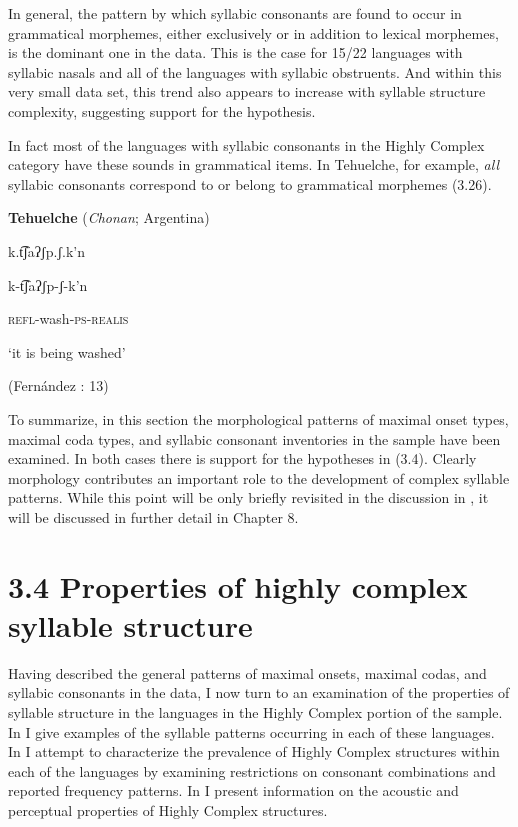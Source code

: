   In general, the pattern by which syllabic consonants are found to occur in grammatical morphemes, either exclusively or in addition to lexical morphemes, is the dominant one in the data. This is the case for 15/22 languages with syllabic nasals and all of the languages with syllabic obstruents. And within this very small data set, this trend also appears to increase with syllable structure complexity, suggesting support for the hypothesis. 



  In fact most of the languages with syllabic consonants in the Highly Complex category have these sounds in grammatical items. In Tehuelche, for example, \textit{all} syllabic consonants correspond to or belong to grammatical morphemes (3.26).



\ea\label{ex:(3.26)}
   \textbf{Tehuelche} (\textit{Chonan}; Argentina)



k.t͡ʃaʔʃp.ʃ.k’n



k{}-t͡ʃaʔʃp{}-ʃ{}-k’n



\textsc{refl}{}-wash-\textsc{ps-realis}



‘it is being washed’



(Fernández \citealt{GarayHernández2006}: 13)
\z



  To summarize, in this section the morphological patterns of maximal onset types, maximal coda types, and syllabic consonant inventories in the sample have been examined. In both cases there is support for the hypotheses in (3.4). Clearly morphology contributes an important role to the development of complex syllable patterns. While this point will be only briefly revisited in the discussion in , it will be discussed in further detail in Chapter 8.


\section{3.4 Properties of highly complex syllable structure}

  Having described the general patterns of maximal onsets, maximal codas, and syllabic consonants in the data, I now turn to an examination of the properties of syllable structure in the languages in the Highly Complex portion of the sample. In  I give examples of the syllable patterns occurring in each of these languages. In  I attempt to characterize the prevalence of Highly Complex structures within each of the languages by examining restrictions on consonant combinations and reported frequency patterns. In  I present information on the acoustic and perceptual properties of Highly Complex structures.


